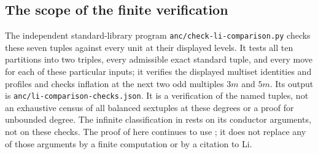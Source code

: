 \subsection{The scope of the finite verification}
The independent standard-library program
\texttt{anc/check-li-comparison.py} checks these seven tuples against
every unit at their displayed levels. It tests all ten partitions into
two triples, every admissible exact standard tuple, and every move for
each of these particular inputs; it verifies the displayed multiset
identities and profiles and checks inflation at the next two odd
multiples $3m$ and $5m$. Its output is
\texttt{anc/li-comparison-checks.json}.
It is a verification of the named tuples, not an exhaustive census of
all balanced sextuples at these degrees or a proof for unbounded degree.
The infinite classification in \cite{Li26b} rests on its conductor
arguments, not on these checks. The proof of  here
continues to use ; it does
not replace any of those arguments by a finite computation or by a
citation to Li.
